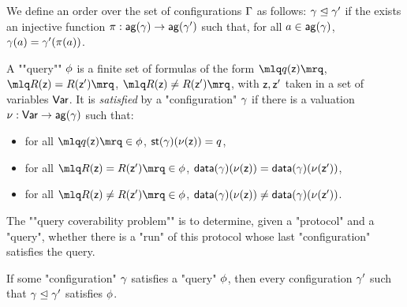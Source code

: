 \begin{definition}
We define an order over the set of configurations $\Gamma$ as follows: $\gamma \trianglelefteq \gamma'$ if the exists an injective function $\pi: \mathsf{ag}(\gamma) \rightarrow \mathsf{ag}(\gamma')$ such that, for all $a \in \mathsf{ag}(\gamma)$, $\gamma(a) = \gamma'(\pi(a))$. 
\end{definition}

\begin{definition}
	A ""query"" $\phi$ is a finite set of formulas of the form $\quotemarks{q(\var{z})}$, $\quotemarks{R(\var{z}) = R(\var{z}')}$, $\quotemarks{R(\var{z}) \neq R(\var{z}')}$, with $\mathsf{z}, \mathsf{z}'$ taken in a set of variables $\mathsf{Var}$.
	It is \emph{satisfied} by a "configuration" $\gamma$ if there is a valuation $\nu : \mathsf{Var} \to \mathsf{ag}(\gamma)$ such that:
	\begin{itemize}
		\item for all $\quotemarks{q(\var{z})} \in \query$, $\mathsf{st}(\gamma)(\nu(\mathsf{z})) = q$,
		
		\item for all $\quotemarks{R(\var{z}) = R(\var{z'})} \in \query$, $\mathsf{data}(\gamma)(\nu(\mathsf{z})) = \mathsf{data}(\gamma)(\nu(\mathsf{z'}))$,
		
		\item for all $\quotemarks{R(\var{z}) \neq R(\var{z'})} \in \query$, $\mathsf{data}(\gamma)(\nu(\mathsf{z})) \neq \mathsf{data}(\gamma)(\nu(\mathsf{z'}))$.
	\end{itemize}

	\AP The ""query coverability problem"" is to determine, given a "protocol" and a "query", whether there is a "run" of this protocol whose last "configuration" satisfies the query.
\end{definition}

\begin{remark}
\label{rem:bigger_config_query}
If some "configuration" $\gamma$ satisfies a "query" $\phi$, then every configuration $\gamma'$ such that $\gamma \trianglelefteq \gamma'$ satisfies $\phi$. 
\end{remark}




